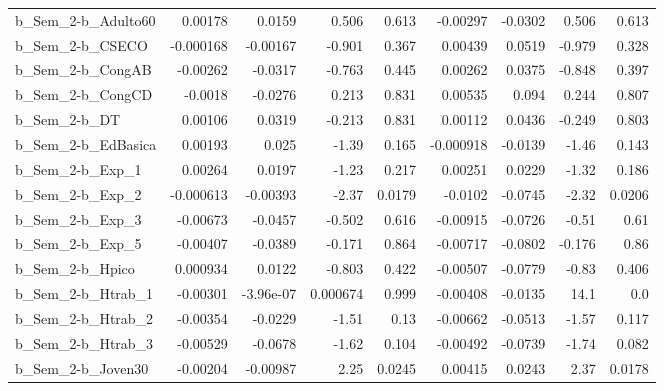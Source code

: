 \begin{tabular}{lrrrrrrrr}
b\_Sem\_2-b\_Adulto60         &     0.00178 &       0.0159 &     0.506 &    0.613 &   -0.00297 &     -0.0302 &        0.506 &         0.613 \\
b\_Sem\_2-b\_CSECO            &   -0.000168 &     -0.00167 &    -0.901 &    0.367 &    0.00439 &      0.0519 &       -0.979 &         0.328 \\
b\_Sem\_2-b\_CongAB           &    -0.00262 &      -0.0317 &    -0.763 &    0.445 &    0.00262 &      0.0375 &       -0.848 &         0.397 \\
b\_Sem\_2-b\_CongCD           &     -0.0018 &      -0.0276 &     0.213 &    0.831 &    0.00535 &       0.094 &        0.244 &         0.807 \\
b\_Sem\_2-b\_DT               &     0.00106 &       0.0319 &    -0.213 &    0.831 &    0.00112 &      0.0436 &       -0.249 &         0.803 \\
b\_Sem\_2-b\_EdBasica         &     0.00193 &        0.025 &     -1.39 &    0.165 &  -0.000918 &     -0.0139 &        -1.46 &         0.143 \\
b\_Sem\_2-b\_Exp\_1            &     0.00264 &       0.0197 &     -1.23 &    0.217 &    0.00251 &      0.0229 &        -1.32 &         0.186 \\
b\_Sem\_2-b\_Exp\_2            &   -0.000613 &     -0.00393 &     -2.37 &   0.0179 &    -0.0102 &     -0.0745 &        -2.32 &        0.0206 \\
b\_Sem\_2-b\_Exp\_3            &    -0.00673 &      -0.0457 &    -0.502 &    0.616 &   -0.00915 &     -0.0726 &        -0.51 &          0.61 \\
b\_Sem\_2-b\_Exp\_5            &    -0.00407 &      -0.0389 &    -0.171 &    0.864 &   -0.00717 &     -0.0802 &       -0.176 &          0.86 \\
b\_Sem\_2-b\_Hpico            &    0.000934 &       0.0122 &    -0.803 &    0.422 &   -0.00507 &     -0.0779 &        -0.83 &         0.406 \\
b\_Sem\_2-b\_Htrab\_1          &    -0.00301 &    -3.96e-07 &  0.000674 &    0.999 &   -0.00408 &     -0.0135 &         14.1 &           0.0 \\
b\_Sem\_2-b\_Htrab\_2          &    -0.00354 &      -0.0229 &     -1.51 &     0.13 &   -0.00662 &     -0.0513 &        -1.57 &         0.117 \\
b\_Sem\_2-b\_Htrab\_3          &    -0.00529 &      -0.0678 &     -1.62 &    0.104 &   -0.00492 &     -0.0739 &        -1.74 &         0.082 \\
b\_Sem\_2-b\_Joven30          &    -0.00204 &     -0.00987 &      2.25 &   0.0245 &    0.00415 &      0.0243 &         2.37 &        0.0178 \\

\end{tabular}
